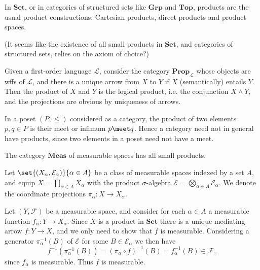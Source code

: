 \documentclass[article, a4paper, 11pt, oneside]{memoir}
\numberwithin{equation}{chapter}
\newcommand{\calL}{\mathcal{L}}
\newcommand{\calE}{\mathcal{E}}
\newcommand{\calF}{\mathcal{F}}
\newcommand{\ncat}[1]{\mathbf{#1}} %
\newcommand{\catSet}{\ncat{Set}}
\newcommand{\catTop}{\ncat{Top}}
\newcommand{\catGrp}{\ncat{Grp}}
\newcommand{\catProp}{\ncat{Prop}}
\newcommand{\catMeas}{\ncat{Meas}}
\begin{document}
\begin{examplebreak}
    \begin{enumexample}
        \item In $\catSet$, or in categories of structured sets like $\catGrp$ and $\catTop$, products are the usual product constructions: Cartesian products, direct products and product spaces.

        (It seems like the existence of all small products in $\catSet$, and categories of structured sets, relies on the axiom of choice?)
        
        \item Given a first-order language $\calL$, consider the category $\catProp_\calL$ whose objects are wffs of $\calL$, and there is a unique arrow from $X$ to $Y$ if $X$ (semantically) entails $Y$. Then the product of $X$ and $Y$ is the logical product, i.e. the conjunction $X \land Y$, and the projections are obvious by uniqueness of arrows.
        
        \item In a poset $(P, \leq)$ considered as a category, the product of two elements $p, q \in P$ is their meet or infimum $p \meet q$. Hence a category need not in general have products, since two elements in a poset need not have a meet.
        
        \item The category $\catMeas$ of measurable spaces has all small products.
        
        Let $\set{(X_\alpha, \calE_\alpha)}{\alpha \in A}$ be a class of measurable spaces indexed by a set $A$, and equip $X = \prod_{\alpha \in A} X_\alpha$ with the product $\sigma$-algebra $\calE = \bigotimes_{\alpha \in A} \calE_\alpha$. We denote the coordinate projections $\pi_\alpha \colon X \to X_\alpha$.
    
        Let $(Y, \calF)$ be a measurable space, and consider for each $\alpha \in A$ a measurable function $f_\alpha \colon Y \to X_\alpha$. Since $X$ is a product in $\catSet$ there is a unique mediating arrow $f \colon Y \to X$, and we only need to show that $f$ is measurable. Considering a generator $\pi_\alpha^{-1}(B)$ of $\calE$ for some $B \in \calE_\alpha$ we then have
        \begin{equation*}
            f^{-1}(\pi_\alpha^{-1}(B))
                = (\pi_\alpha \circ f)^{-1}(B)
                = f_\alpha^{-1}(B) \in \calF,
        \end{equation*}
        since $f_\alpha$ is measurable. Thus $f$ is measurable.
    \end{enumexample}
\end{examplebreak}
\end{document}
